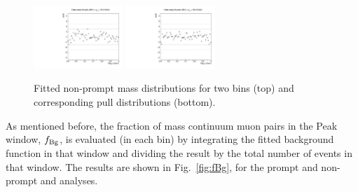 \begin{figure}[hb!]
\includegraphics[width=0.3\textwidth]{Figures/chapter4/Npulls_pt2.pdf}
\includegraphics[width=0.3\textwidth]{Figures/chapter4/Npulls_pt5.pdf}
\caption{Fitted non-prompt \psip mass distributions for two \pt bins (top) 
and corresponding pull distributions (bottom).}
\label{fig:mass-fits-psip-NP}
\end{figure}

\vfill\newpage

As mentioned before, 
the fraction of mass continuum muon pairs in the Peak window, $f_{\rm Bg}$, 
is evaluated (in each \pt bin) by integrating the fitted background function 
in that window and dividing the result by the total number of events in that window.
The results are shown in Fig.~\ref{fig:fBg}, for the prompt and non-prompt
\jpsi and \psip analyses.

